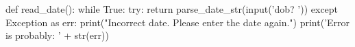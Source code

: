 %
\begin{py}
def read_date():
    while True:
        try:
            return parse_date_str(input('dob? '))
        except Exception as err:
            print("Incorrect date. Please enter the date again.")
            print('Error is probably: ' + str(err))
\end{py}
%

